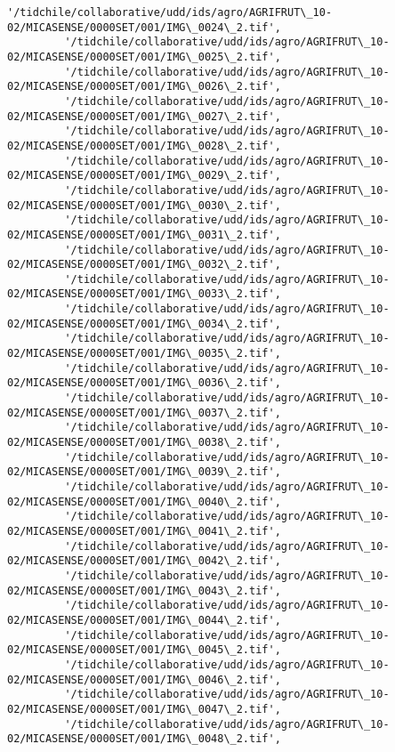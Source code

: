 \documentclass[11pt]{article}
\begin{document}
\begin{Verbatim}[commandchars=\\\{\}]
         '/tidchile/collaborative/udd/ids/agro/AGRIFRUT\_10-02/MICASENSE/0000SET/001/IMG\_0024\_2.tif',
         '/tidchile/collaborative/udd/ids/agro/AGRIFRUT\_10-02/MICASENSE/0000SET/001/IMG\_0025\_2.tif',
         '/tidchile/collaborative/udd/ids/agro/AGRIFRUT\_10-02/MICASENSE/0000SET/001/IMG\_0026\_2.tif',
         '/tidchile/collaborative/udd/ids/agro/AGRIFRUT\_10-02/MICASENSE/0000SET/001/IMG\_0027\_2.tif',
         '/tidchile/collaborative/udd/ids/agro/AGRIFRUT\_10-02/MICASENSE/0000SET/001/IMG\_0028\_2.tif',
         '/tidchile/collaborative/udd/ids/agro/AGRIFRUT\_10-02/MICASENSE/0000SET/001/IMG\_0029\_2.tif',
         '/tidchile/collaborative/udd/ids/agro/AGRIFRUT\_10-02/MICASENSE/0000SET/001/IMG\_0030\_2.tif',
         '/tidchile/collaborative/udd/ids/agro/AGRIFRUT\_10-02/MICASENSE/0000SET/001/IMG\_0031\_2.tif',
         '/tidchile/collaborative/udd/ids/agro/AGRIFRUT\_10-02/MICASENSE/0000SET/001/IMG\_0032\_2.tif',
         '/tidchile/collaborative/udd/ids/agro/AGRIFRUT\_10-02/MICASENSE/0000SET/001/IMG\_0033\_2.tif',
         '/tidchile/collaborative/udd/ids/agro/AGRIFRUT\_10-02/MICASENSE/0000SET/001/IMG\_0034\_2.tif',
         '/tidchile/collaborative/udd/ids/agro/AGRIFRUT\_10-02/MICASENSE/0000SET/001/IMG\_0035\_2.tif',
         '/tidchile/collaborative/udd/ids/agro/AGRIFRUT\_10-02/MICASENSE/0000SET/001/IMG\_0036\_2.tif',
         '/tidchile/collaborative/udd/ids/agro/AGRIFRUT\_10-02/MICASENSE/0000SET/001/IMG\_0037\_2.tif',
         '/tidchile/collaborative/udd/ids/agro/AGRIFRUT\_10-02/MICASENSE/0000SET/001/IMG\_0038\_2.tif',
         '/tidchile/collaborative/udd/ids/agro/AGRIFRUT\_10-02/MICASENSE/0000SET/001/IMG\_0039\_2.tif',
         '/tidchile/collaborative/udd/ids/agro/AGRIFRUT\_10-02/MICASENSE/0000SET/001/IMG\_0040\_2.tif',
         '/tidchile/collaborative/udd/ids/agro/AGRIFRUT\_10-02/MICASENSE/0000SET/001/IMG\_0041\_2.tif',
         '/tidchile/collaborative/udd/ids/agro/AGRIFRUT\_10-02/MICASENSE/0000SET/001/IMG\_0042\_2.tif',
         '/tidchile/collaborative/udd/ids/agro/AGRIFRUT\_10-02/MICASENSE/0000SET/001/IMG\_0043\_2.tif',
         '/tidchile/collaborative/udd/ids/agro/AGRIFRUT\_10-02/MICASENSE/0000SET/001/IMG\_0044\_2.tif',
         '/tidchile/collaborative/udd/ids/agro/AGRIFRUT\_10-02/MICASENSE/0000SET/001/IMG\_0045\_2.tif',
         '/tidchile/collaborative/udd/ids/agro/AGRIFRUT\_10-02/MICASENSE/0000SET/001/IMG\_0046\_2.tif',
         '/tidchile/collaborative/udd/ids/agro/AGRIFRUT\_10-02/MICASENSE/0000SET/001/IMG\_0047\_2.tif',
         '/tidchile/collaborative/udd/ids/agro/AGRIFRUT\_10-02/MICASENSE/0000SET/001/IMG\_0048\_2.tif',

\end{Verbatim}
\end{document}
